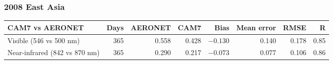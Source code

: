 \begin{frame}[t]
\frametitle{2008 East Asia}
\centering
{}\hfill
{}\par
\vspace{0.15cm}
\hfill
{}\par
\vspace{0.1cm}
{\tiny\setlength{\tabcolsep}{5pt}
\begin{tabular}{@{}lrrrrrrr@{}}
\toprule
CAM7 vs AERONET & Days & AERONET & CAM7 & Bias & Mean error & RMSE & R \\
\midrule
Visible (546 vs 500 nm) & 365 & 0.558 & 0.428 & $-0.130$ & 0.140 & 0.178 & 0.85 \\
Near-infrared (842 vs 870 nm) & 365 & 0.290 & 0.217 & $-0.073$ & 0.077 & 0.106 & 0.86 \\
\bottomrule
\end{tabular}\par}
\end{frame}
